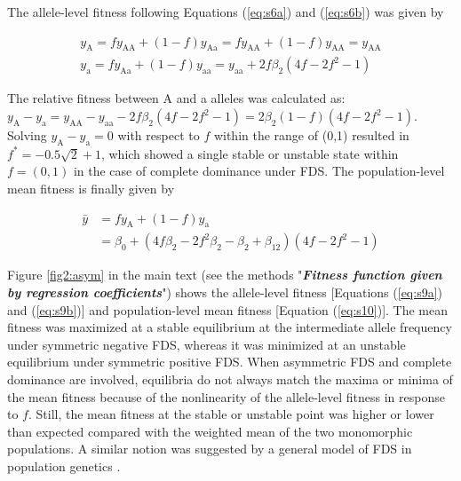 \documentclass[12pt,]{article}
\begin{document}
\noindent
The allele-level fitness following Equations (\ref{eq:s6a}) and (\ref{eq:s6b}) was given by 

\begin{subequations}
\begin{align}
y_\mathrm{A} = fy_\mathrm{AA} + (1-f)y_\mathrm{Aa} = fy_\mathrm{AA} + (1-f)y_\mathrm{AA} = y_\mathrm{AA} \label{eq:s9a} \\
y_\mathrm{a} = fy_\mathrm{Aa} + (1-f)y_\mathrm{aa} = y_\mathrm{aa} + 2f\beta_2(4f-2f^2-1) \label{eq:s9b}
\end{align}
\end{subequations}

\noindent
The relative fitness between A and a alleles was calculated as: $y_\mathrm{A} - y_\mathrm{a} = y_\mathrm{AA} - y_\mathrm{aa} - 2f\beta_2(4f-2f^2-1) = 2\beta_2(1-f)(4f-2f^2-1)$. Solving $y_\mathrm{A} - y_\mathrm{a} = 0$ with respect to $f$ within the range of (0,1) resulted in $f^*=-0.5\sqrt{2}+1$, which showed a single stable or unstable state within $f=(0,1)$ in the case of complete dominance under FDS. The population-level mean fitness is finally given by

\begin{equation}
\begin{split}
\bar{y} &= fy_\mathrm{A} + (1-f)y_\mathrm{a} \\
&= \beta_0 + (4f\beta_2-2f^2\beta_2-\beta_2+\beta_{12})(4f-2f^2-1) \label{eq:s10}
\end{split}
\end{equation}

\noindent
Figure \ref{fig2:asym} in the main text (see the methods "\textit{\textbf{Fitness function given by regression coefficients}}") shows the allele-level fitness [Equations (\ref{eq:s9a}) and (\ref{eq:s9b})] and population-level mean fitness [Equation (\ref{eq:s10})]. The mean fitness was maximized at a stable equilibrium at the intermediate allele frequency under symmetric negative FDS, whereas it was minimized at an unstable equilibrium under symmetric positive FDS. When asymmetric FDS and complete dominance are involved, equilibria do not always match the maxima or minima of the mean fitness because of the nonlinearity of the allele-level fitness in response to $f$. Still, the mean fitness at the stable or unstable point was higher or lower than expected compared with the weighted mean of the two monomorphic populations. A similar notion was suggested by a general model of FDS in population genetics \citep{cockerham1972frequency, schneider_maximization_2008}.
\end{document}
